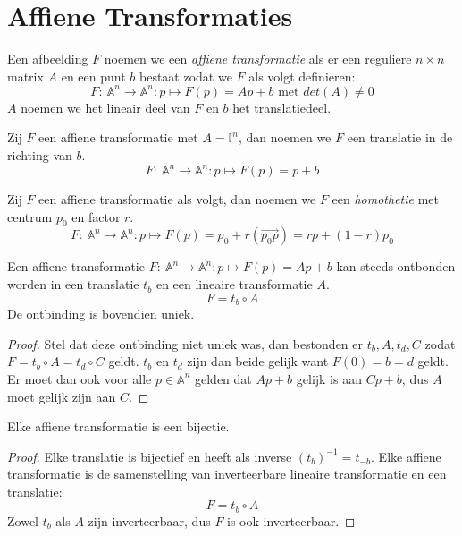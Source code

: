 \documentclass[main.tex]{subfiles}
\begin{document}
\chapter{Affiene Transformaties}
\label{cha:affiene-transformaties}

\begin{de}
  Een afbeelding $F$ noemen we een \emph{affiene transformatie} als er een reguliere $n\times n$ matrix $A$ en een punt $b$ bestaat zodat we $F$ als volgt definieren:
  \[ F:\ \mathbb{A}^{n} \rightarrow \mathbb{A}^{n}: p \mapsto F(p) = Ap + b \text{ met } det(A) \neq 0 \]
  $A$ noemen we het lineair deel van $F$ en $b$ het translatiedeel.
\end{de}

\begin{de}
  Zij $F$ een affiene transformatie met $A=\mathbb{I}^{n}$, dan noemen we $F$ een translatie in de richting van $b$.
  \[ F:\ \mathbb{A}^{n} \rightarrow \mathbb{A}^{n}: p \mapsto F(p) = p + b \]
\end{de}

\begin{de}
  Zij $F$ een affiene transformatie als volgt, dan noemen we $F$ een \emph{homothetie} met centrum $p_{0}$ en factor $r$.
  \[ F:\ \mathbb{A}^{n} \rightarrow \mathbb{A}^{n}: p \mapsto F(p) = p_{0} + r(\overrightarrow{p_{0}p}) = rp + (1-r)p_{0} \]
\end{de}

\begin{st}
  Een affiene transformatie $F:\ \mathbb{A}^{n} \rightarrow \mathbb{A}^{n}: p \mapsto F(p) = Ap + b$ kan steeds ontbonden worden in een translatie $t_{b}$ en een lineaire transformatie $A$.
  \[ F = t_{b} \circ A \]
  De ontbinding is bovendien uniek.

  \begin{proof}
    Stel dat deze ontbinding niet uniek was, dan bestonden er $t_{b},A,t_{d},C$ zodat $F = t_{b}\circ A = t_{d} \circ C$ geldt.
    $t_{b}$ en $t_{d}$ zijn dan beide gelijk want $F(0) = b = d$ geldt.
    Er moet dan ook voor alle $p\in \mathbb{A}^{n}$ gelden dat $Ap+b$ gelijk is aan $Cp+b$, dus $A$ moet gelijk zijn aan $C$.
  \end{proof}
\end{st}

\begin{st}
  Elke affiene transformatie is een bijectie.

  \begin{proof}
    Elke translatie is bijectief en heeft als inverse $(t_{b})^{-1} = t_{-b}$.
    Elke affiene transformatie is de samenstelling van inverteerbare lineaire transformatie en een translatie:
    \[ F = t_{b} \circ A \]
    Zowel $t_{b}$ als $A$ zijn inverteerbaar, dus $F$ is ook inverteerbaar.
  \end{proof}
\end{st}
\end{document}
